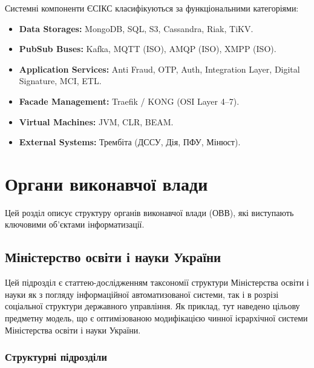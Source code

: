 Системні компоненти ЄСІКС класифікуються за функціональними категоріями:

\begin{itemize}
    \item \textbf{Data Storages:} MongoDB, SQL, S3, Cassandra, Riak, TiKV.
    \item \textbf{PubSub Buses:} Kafka, MQTT (ISO), AMQP (ISO), XMPP (ISO).
    \item \textbf{Application Services:} Anti Fraud, OTP, Auth, Integration Layer,
          Digital Signature, MCI, ETL.
    \item \textbf{Facade Management:} Traefik / KONG (OSI Layer 4--7).
    \item \textbf{Virtual Machines:} JVM, CLR, BEAM.
    \item \textbf{External Systems:} Трембіта (ДССУ, Дія, ПФУ, Мінюст).
\end{itemize}

\newpage
\chapter{Органи виконавчої влади}

Цей розділ описує структуру органів виконавчої влади (ОВВ), які
виступають ключовими об'єктами інформатизації.

\section{Міністерство освіти і науки України}

Цей підрозділ є статтею-дослідженням таксономії структури Міністерства освіти і науки як з погляду інформаційної автоматизованої системи, так і в розрізі соціальної структури державного управління. Як приклад, тут наведено цільову предметну модель, що є оптимізованою модифікацією чинної ієрархічної системи Міністерства освіти і науки України.

\subsection*{Структурні підрозділи}

